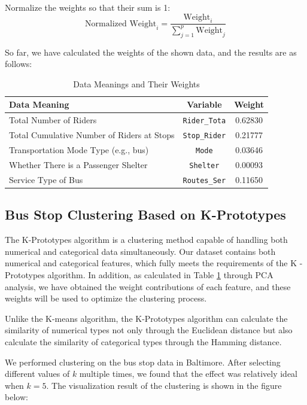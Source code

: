 \documentclass{mcmthesis}
\begin{document}
Normalize the weights so that their sum is 1:
\begin{equation}
\text{Normalized Weight}_i = \frac{\text{Weight}_i}{\sum_{j = 1}^p \text{Weight}_j}
\end{equation}

So far, we have calculated the weights of the shown data, and the results are as follows:

\begin{table}[H]
  \centering
  \caption{Data Meanings and Their Weights}
  \label{tab:data_weights}
  \begin{tabular}{@{}lcc@{}}
      \toprule
      \textbf{Data Meaning} & \textbf{Variable} & \textbf{Weight} \\
      \midrule
      Total Number of Riders & \texttt{Rider\_Tota} & 0.62830 \\
      Total Cumulative Number of Riders at Stops & \texttt{Stop\_Rider} & 0.21777 \\
      Transportation Mode Type (e.g., bus) & \texttt{Mode} & 0.03646 \\
      Whether There is a Passenger Shelter & \texttt{Shelter} & 0.00093 \\
      Service Type of Bus & \texttt{Routes\_Ser} & 0.11650 \\
      \bottomrule
  \end{tabular}
\end{table}

\subsection{Bus Stop Clustering Based on K-Prototypes}

The K-Prototypes algorithm\cite{Huang1998} is a clustering method capable of handling both numerical and categorical data simultaneously. Our dataset contains both numerical and categorical features, which fully meets the requirements of the K - Prototypes algorithm. In addition, as calculated in Table \ref{tab:data_weights} through PCA analysis, we have obtained the weight contributions of each feature, and these weights will be used to optimize the clustering process.

Unlike the K-means algorithm, the K-Prototypes algorithm can calculate the similarity of numerical types not only through the Euclidean distance but also calculate the similarity of categorical types through the Hamming distance.

We performed clustering on the bus stop data in Baltimore. After selecting different values of $k$ multiple times, we found that the effect was relatively ideal when $k = 5$. The visualization result of the clustering is shown in the figure below:
\end{document}
